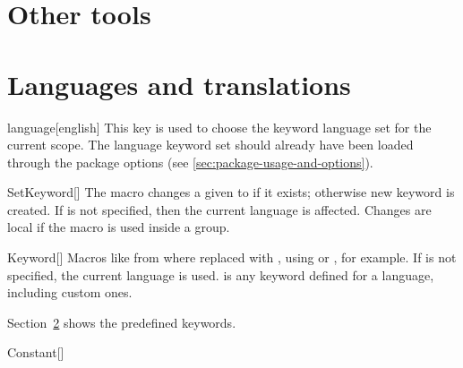 \documentclass[a4paper, 11pt]{article}
\begin{document}
\section{Other tools}


\section{Languages and translations}\label{sec:languages-and-translations}

\begin{option}{language}{}[english]
    This key is used to choose the keyword language set for the current scope. The language keyword set should already have been loaded through the package options (see \cref{sec:package-usage-and-options}).
\end{option}



\begin{macro}{SetKeyword}[]
    The macro  changes a given  to  if it exists; otherwise new keyword is created.
    If  is not specified, then the current language is affected. Changes are local if the macro is used inside a group.
\end{macro}

\begin{macro}{Keyword}[]
    Macros like  from  where replaced with , using  or , for example.
    If  is not specified, the current language is used.  is any keyword defined for a language, including custom ones.

    Section~\ref{sec:languages-and-translations} shows the predefined keywords.

\end{macro}

\begin{macro}{Constant}[]
\end{macro}


\end{document}
